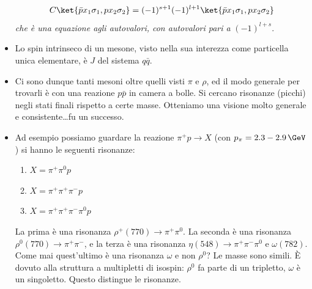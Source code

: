 \begin{itemize}
    \begin{equation*}
    C\ket{\bar px_1\sigma_1,px_2\sigma_2}=(-1)^{s+1}(-1)^{l+1}\ket{\bar px_1\sigma_1,px_2\sigma_2}
    \end{equation*}
    \textit{che è una equazione agli autovalori, con autovalori pari a }$(-1)^{l+s}$.
    \item Lo spin intrinseco di un mesone, visto nella sua interezza come particella unica elementare, è $J$ del sistema $q\bar q$.
    \item Ci sono dunque tanti mesoni oltre quelli visti $\pi$ e $\rho$, ed il modo generale per trovarli è con una reazione $p\bar p$ in camera a bolle. Si cercano risonanze (picchi) negli stati finali rispetto a certe masse. Otteniamo una visione molto generale e consistente\dots fu un successo.
    \item Ad esempio possiamo guardare la reazione $\pi^+p\to X$ (con $p_\pi=2.3-2.9\,\GeV$) si hanno le seguenti risonanze:
    \begin{enumerate}
    \item $X=\pi^+\pi^0p$
    \item $X=\pi^+\pi^+\pi^-p$
    \item $X=\pi^+\pi^+\pi^-\pi^0p$
    \end{enumerate}
    La prima è una risonanza $\rho^+(770)\to\pi^+\pi^0$. La seconda è una risonanza $\rho^0(770)\to\pi^+\pi^-$, e la terza è una risonanza $\eta(548)\to\pi^+\pi^-\pi^0$ e $\omega(782)$. Come mai quest'ultimo è una risonanza $\omega$ e non $\rho^0$? Le masse sono simili. È dovuto alla struttura a multipletti di isospin: $\rho^0$ fa parte di un tripletto, $\omega$ è un singoletto. Questo distingue le risonanze.
\end{itemize}
